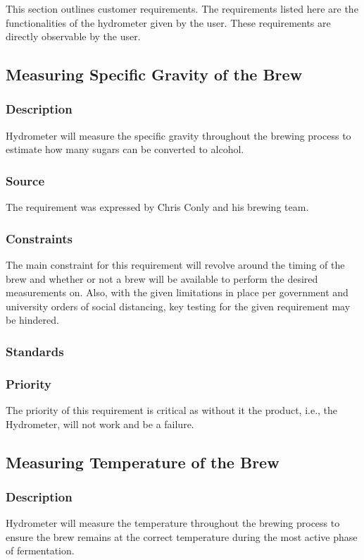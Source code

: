 This section outlines customer requirements. The requirements listed here are the functionalities of the hydrometer given by the user. These requirements are directly observable by the user.

\subsection{Measuring Specific Gravity of the Brew}
\subsubsection{Description}
Hydrometer will measure the specific gravity throughout the brewing process to estimate how many sugars can be converted to alcohol.
\subsubsection{Source}
The requirement was expressed by Chris Conly and his brewing team.
\subsubsection{Constraints}
The main constraint for this requirement will revolve around the timing of the brew and whether or not a brew will be available to perform the desired measurements on. Also, with the given limitations in place per government and university orders of social distancing, key testing for the given requirement may be hindered.
\subsubsection{Standards}

\subsubsection{Priority}
The priority of this requirement is critical as without it the product, i.e., the Hydrometer, will not work and be a failure.
\subsection{Measuring Temperature of the Brew}
\subsubsection{Description}
Hydrometer will measure the temperature throughout the brewing process to ensure the brew remains at the correct temperature during the most active phase of fermentation.

